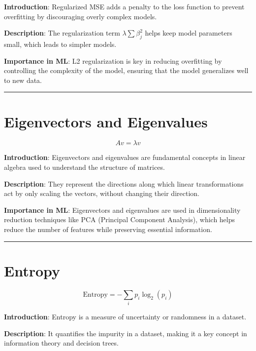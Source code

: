 \documentclass[
  12 pt,
  a4paper,
]{book}
\numberwithin{equation}{section}
\theoremstyle{plain}      %
\theoremstyle{definition} %
\theoremstyle{remark}     %
\theoremstyle{note}         %
\begin{document}
\textbf{Introduction}: Regularized MSE adds a penalty to the loss
function to prevent overfitting by discouraging overly complex models.

\textbf{Description}: The regularization term \(\lambda \sum \beta_j^2\)
helps keep model parameters small, which leads to simpler models.

\textbf{Importance in ML}: L2 regularization is key in reducing
overfitting by controlling the complexity of the model, ensuring that
the model generalizes well to new data.

\begin{center}\rule{0.5\linewidth}{0.5pt}\end{center}

\newpage

\hypertarget{eigenvectors-and-eigenvalues}{%
\chapter{Eigenvectors and
Eigenvalues}\label{eigenvectors-and-eigenvalues}}

\[
A v = \lambda v
\]

\textbf{Introduction}: Eigenvectors and eigenvalues are fundamental
concepts in linear algebra used to understand the structure of matrices.

\textbf{Description}: They represent the directions along which linear
transformations act by only scaling the vectors, without changing their
direction.

\textbf{Importance in ML}: Eigenvectors and eigenvalues are used in
dimensionality reduction techniques like PCA (Principal Component
Analysis), which helps reduce the number of features while preserving
essential information.

\begin{center}\rule{0.5\linewidth}{0.5pt}\end{center}

\newpage

\hypertarget{entropy}{%
\chapter{Entropy}\label{entropy}}

\[
\text{Entropy} = - \sum_{i} p_i \log_2(p_i)
\]

\textbf{Introduction}: Entropy is a measure of uncertainty or randomness
in a dataset.

\textbf{Description}: It quantifies the impurity in a dataset, making it
a key concept in information theory and decision trees.
\end{document}
